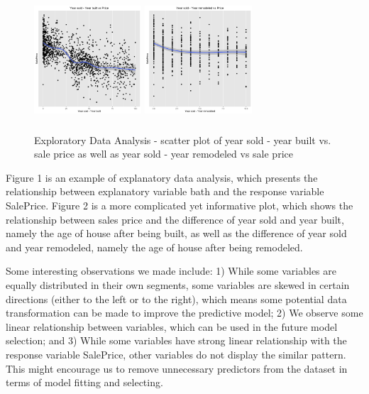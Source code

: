 \documentclass[letterpaper, 10 pt, conference]{ieeeconf}\usepackage[]{graphicx}\usepackage[]{color}
\begin{document}
   \begin{figure}[thpb]
      \centering
      \includegraphics[width =  4cm, height = 4.5cm]{../images/scatter_Year_sold_Year_built_Vs_Price.png}
      \includegraphics[width =  4cm, height = 4.5cm]{../images/scatter_Year_sold_Year_remodeled_Vs_Price.png}
      \caption{Exploratory Data Analysis - scatter plot of year sold - year built vs. sale price as well as year sold - year remodeled vs sale price}
      \label{figurelabel}
   \end{figure}
   
Figure 1 is an example of explanatory data analysis, which presents the relationship between explanatory variable bath and the response variable SalePrice. Figure 2 is a more complicated yet informative plot, which shows the relationship between sales price and the difference of year sold and year built, namely the age of house after being built, as well as the difference of year sold and year remodeled, namely the age of house after being remodeled.

Some interesting observations we made include: 1) While some variables are equally distributed in their own segments, some variables are skewed in certain directions (either to the left or to the right), which means some potential data transformation can be made to improve the predictive model; 2) We observe some linear relationship between variables, which can be used in the future model selection; and 3) While some variables have strong linear relationship with the response variable SalePrice, other variables do not display the similar pattern. This might encourage us to remove unnecessary predictors from the dataset in terms of model fitting and selecting.
\end{document}
